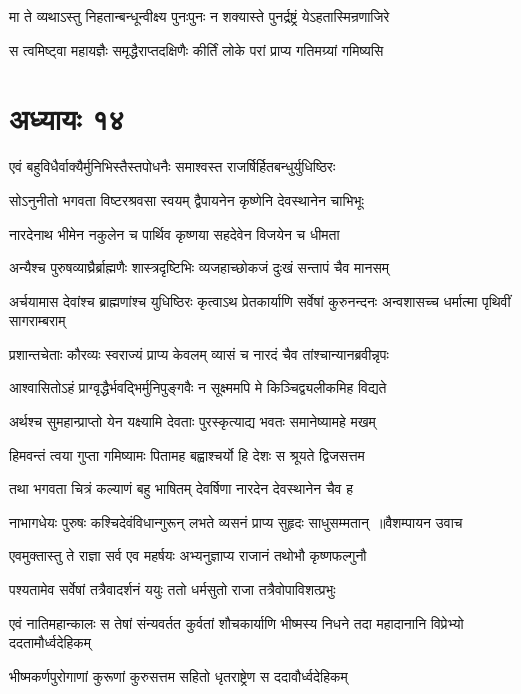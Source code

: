 \twolineshloka
{मा ते व्यथाऽस्तु निहतान्बन्धून्वीक्ष्य पुनःपुनः}
{न शक्यास्ते पुनर्द्रष्ट्रं येऽहतास्मिन्रणाजिरे}


\twolineshloka
{स त्वमिष्ट्वा महायज्ञैः समृद्धैराप्तदक्षिणैः}
{कीर्तिं लोके परां प्राप्य गतिमग्र्यां गमिष्यसि}


\chapter{अध्यायः १४}
\twolineshloka
{एवं बहुविधैर्वाक्यैर्मुनिभिस्तैस्तपोधनैः}
{समाश्वस्त राजर्षिर्हितबन्धुर्युधिष्ठिरः}


\twolineshloka
{सोऽनुनीतो भगवता विष्टरश्रवसा स्वयम्}
{द्वैपायनेन कृष्णेनि देवस्थानेन चाभिभूः}


\twolineshloka
{नारदेनाथ भीमेन नकुलेन च पार्थिव}
{कृष्णया सहदेवेन विजयेन च धीमता}


\twolineshloka
{अन्यैश्च पुरुषव्याघ्रैर्ब्राह्मणैः शास्त्रदृष्टिभिः}
{व्यजहाच्छोकजं दुःखं सन्तापं चैव मानसम्}


\threelineshloka
{अर्चयामास देवांश्च ब्राह्मणांश्च युधिष्ठिरः}
{कृत्वाऽथ प्रेतकार्याणि सर्वेषां कुरुनन्दनः}
{अन्वशासच्च धर्मात्मा पृथिवीं सागराम्बराम्}


\twolineshloka
{प्रशान्तचेताः कौरव्यः स्वराज्यं प्राप्य केवलम्}
{व्यासं च नारदं चैव तांश्चान्यानब्रवीन्नृपः}


\twolineshloka
{आश्वासितोऽहं प्राग्वृद्धैर्भवद्भिर्मुनिपुङ्गवैः}
{न सूक्ष्ममपि मे किञ्चिद्व्यलीकमिह विद्यते}


\twolineshloka
{अर्थश्च सुमहान्प्राप्तो येन यक्ष्यामि देवताः}
{पुरस्कृत्याद्य भवतः समानेष्यामहे मखम्}


\twolineshloka
{हिमवन्तं त्वया गुप्ता गमिष्यामः पितामह}
{बह्वाश्चर्यो हि देशः स श्रूयते द्विजसत्तम}


\twolineshloka
{तथा भगवता चित्रं कल्याणं बहु भाषितम्}
{देवर्षिणा नारदेन देवस्थानेन चैव ह}


\threelineshloka
{नाभागधेयः पुरुषः कश्चिदेवंविधान्गुरून्}
{लभते व्यसनं प्राप्य सुहृदः साधुसम्मतान् ॥वैशम्पायन उवाच}
{}


\twolineshloka
{एवमुक्तास्तु ते राज्ञा सर्व एव महर्षयः}
{अभ्यनुज्ञाप्य राजानं तथोभौ कृष्णफल्गुनौ}


\twolineshloka
{पश्यतामेव सर्वेषां तत्रैवादर्शनं ययुः}
{ततो धर्मसुतो राजा तत्रैवोपाविशत्प्रभुः}


\threelineshloka
{एवं नातिमहान्कालः स तेषां संन्यवर्तत}
{कुर्वतां शौचकार्याणि भीष्मस्य निधने तदा}
{महादानानि विप्रेभ्यो ददतामौर्ध्वदेहिकम्}


\twolineshloka
{भीष्मकर्णपुरोगाणां कुरूणां कुरुसत्तम}
{सहितो धृतराष्ट्रेण स ददावौर्ध्वदेहिकम्}



